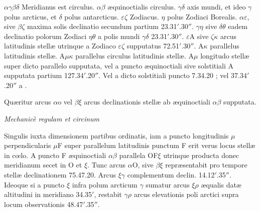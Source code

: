 \documentclass[11pt,a4paper]{article}
\begin{document}
$\alpha\gamma\beta\delta$ Meridianus est circulus. $\alpha\beta$ æquinoctialis circulus. $\gamma\delta$ axis mundi, et ideo $\gamma$ polus arcticus, et $\delta$ polus antarcticus. $\varepsilon\zeta$ Zodiacus. $\eta$ polus Zodiaci Borealis. $\alpha\varepsilon$, sive $\beta\zeta$ maxima solis declinatio secundum  partium 23.31$'$.30$''$. $\gamma\eta$ sive $\delta\theta$ eadem declinatio polorum Zodiaci $\eta\theta$ a polis mundi $\gamma\delta$ 23.31$'$.30$''$. $\varepsilon$A sive $\zeta\kappa$ arcus latitudinis stellæ utrinque a Zodiaco $\varepsilon\zeta$ supputatus 72.51$'$.30$''$. A$\kappa$ parallelus latitudinis stellæ. A$\mu\kappa$ parallelus circulus latitudinis stellæ. A$\mu$ longitudo stellæ super dicto parallelo supputata, vel a puncto æquinoctiali  sive solstitiali A supputata partium 127.34$'$.20$''$. Vel a dicto solstitiali puncto  7.34.20 ; vel 37.34$'$.20$''$ a .

Quæritur arcus $\alpha$o vel $\beta\xi$  arcus declinationis stellæ ab æquinoctiali $\alpha\beta$ supputata.

\emph{Mechanicè  regulam et circinum}

Singulis iuxta dimensionem partibus ordinatis, iam a puncto longitudinis $\mu$  perpendicularis $\mu$F super parallelum latitudinis punctum F erit verus locus stellæ in cœlo. A puncto F  æquinoctiali $\alpha\beta$ parallela OF$\xi$ utrinque producta donec meridianum secet in O et $\xi$. Tunc arcus $\alpha$O, sive $\beta\xi$ repræsentabit  pro tempore stellæ declinationem 75.47.20. Arcus $\xi\gamma$ complementum declin. 14.12$'$.35$''$. Ideoque si a puncto $\xi$ infra polum arcticum $\gamma$ sumatur arcus $\xi\rho$ æqualis datæ altitudini in meridiano 34.35$'$, restabit $\gamma\rho$ arcus elevationis poli arctici supra locum observationis 48.47$'$.35$''$.
\end{document}
